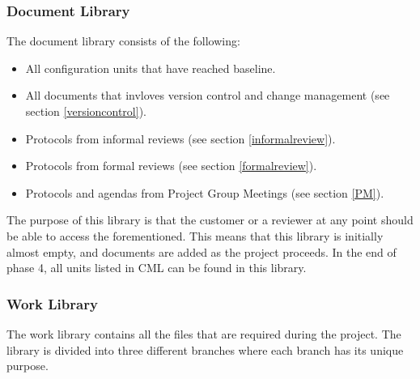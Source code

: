 \documentclass{article}
\begin{document}
        \subsubsection{Document Library \label{doclibrary}}
            The document library consists of the following:
            
            \begin{itemize}
                \item All configuration units that have reached baseline.
                \item All documents that invloves version control and change management (see section \ref{versioncontrol}).
                \item Protocols from informal reviews (see section \ref{informalreview}).
                \item Protocols from formal reviews (see section \ref{formalreview}).
                \item Protocols and agendas from Project Group Meetings (see section \ref{PM}).
            \end{itemize}
            \noindent
            The purpose of this library is that the customer or a reviewer at any point should be able to access the forementioned. 
            This means that this library is initially almost empty, and documents are added as the project proceeds. In the end of phase 4, all units listed in CML can be found in this library.

            
        \subsubsection{Work Library}
            The work library contains all the files that are required during the project.
            The library is divided into three different branches where each branch has its unique purpose.
            
\end{document}

